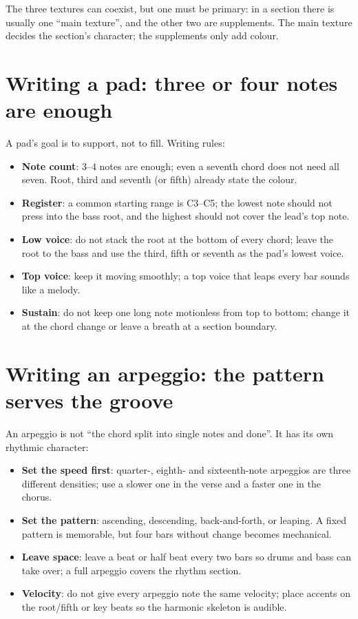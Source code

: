 The three textures can coexist, but one must be primary: in a section there is usually one ``main texture'', and the other two are supplements. The main texture decides the section's character; the supplements only add colour.

\section{Writing a pad: three or four notes are enough}
\label{sec:pad}

A pad's goal is to support, not to fill. Writing rules:

\begin{itemize}
\item \textbf{Note count}: 3--4 notes are enough; even a seventh chord does not need all seven. Root, third and seventh (or fifth) already state the colour.
\item \textbf{Register}: a common starting range is C3--C5; the lowest note should not press into the bass root, and the highest should not cover the lead's top note.
\item \textbf{Low voice}: do not stack the root at the bottom of every chord; leave the root to the bass and use the third, fifth or seventh as the pad's lowest voice.
\item \textbf{Top voice}: keep it moving smoothly; a top voice that leaps every bar sounds like a melody.
\item \textbf{Sustain}: do not keep one long note motionless from top to bottom; change it at the chord change or leave a breath at a section boundary.
\end{itemize}

\section{Writing an arpeggio: the pattern serves the groove}
\label{sec:arpeggio}

An arpeggio is not ``the chord split into single notes and done''. It has its own rhythmic character:

\begin{itemize}
\item \textbf{Set the speed first}: quarter-, eighth- and sixteenth-note arpeggios are three different densities; use a slower one in the verse and a faster one in the chorus.
\item \textbf{Set the pattern}: ascending, descending, back-and-forth, or leaping. A fixed pattern is memorable, but four bars without change becomes mechanical.
\item \textbf{Leave space}: leave a beat or half beat every two bars so drums and bass can take over; a full arpeggio covers the rhythm section.
\item \textbf{Velocity}: do not give every arpeggio note the same velocity; place accents on the root/fifth or key beats so the harmonic skeleton is audible.
\end{itemize}

